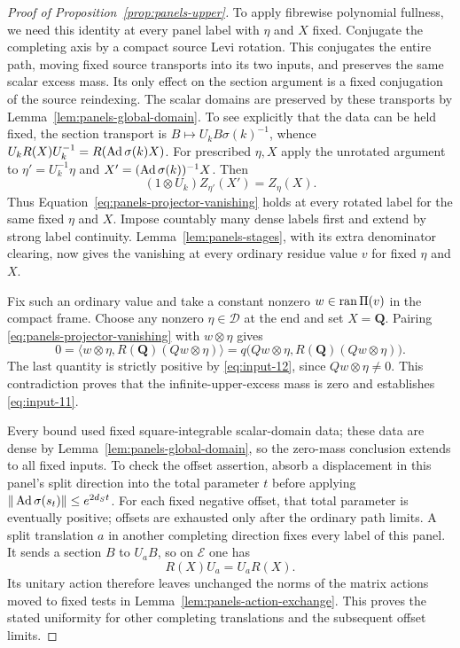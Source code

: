 \begin{proof}[Proof of Proposition~\ref{prop:panels-upper}]
To apply fibrewise polynomial fullness, we need this identity at every
panel label with $\eta$ and $X$ fixed.  Conjugate the completing axis by a
compact source Levi rotation.  This conjugates the entire
path, moving fixed source transports into its two inputs, and preserves
the same scalar excess mass.  Its only effect on the section argument
is a fixed conjugation of the source reindexing.  The scalar domains are
preserved by these transports by
Lemma~\ref{lem:panels-global-domain}.  To see explicitly that the data can be held fixed, the section transport
is $B\mapsto U_k B\sigma(k)^{-1}$, whence
$U_kR(X)U_k^{-1}=R(\operatorname{Ad}\sigma(k)X)$. For prescribed $\eta,X$ apply
the unrotated argument to $\eta'=U_k^{-1}\eta$ and
$X'=(\operatorname{Ad}\sigma(k))^{-1}X$. Then
\[
 (1\otimes U_k)Z_{\eta'}(X')=Z_\eta(X).
\]
Thus Equation~\eqref{eq:panels-projector-vanishing} holds at every
rotated label for the same fixed $\eta$ and $X$.  Impose countably many dense labels first and
extend by strong label continuity.  Lemma~\ref{lem:panels-stages}, with
its extra denominator clearing, now gives the vanishing at every
ordinary residue value $v$ for fixed $\eta$ and $X$.

Fix such an ordinary value and take a constant nonzero
$w\in\operatorname{ran}\Pi(v)$ in the compact frame.  Choose any nonzero
$\eta\in\mathscr D$ at the end and set $X=\mathbf Q$.  Pairing
\eqref{eq:panels-projector-vanishing} with $w\otimes\eta$ gives
\[
 0=\big\langle w\otimes\eta,
          R(\mathbf Q)(Qw\otimes\eta)\big\rangle
   =q\bigl(Qw\otimes\eta,
          R(\mathbf Q)(Qw\otimes\eta)\bigr).
\]
The last quantity is strictly positive by \eqref{eq:input-12}, since
$Qw\otimes\eta\ne0$.  This contradiction proves that the
infinite-upper-excess mass is zero and establishes
\eqref{eq:input-11}.

Every bound used fixed square-integrable scalar-domain data; these data
are dense by Lemma~\ref{lem:panels-global-domain}, so the zero-mass
conclusion extends to all fixed inputs.  To check the offset assertion, absorb a displacement in this panel's
split direction into the total parameter $t$ before applying
$\|\operatorname{Ad}\sigma(s_t)\|\leq e^{2d_St}$.  For each fixed negative offset,
that total parameter is eventually positive; offsets are exhausted only
after the ordinary path limits.  A split translation $a$ in another
completing direction fixes every label of this panel.  It sends a section
$B$ to $U_aB$, so on $\mathcal E$ one has
\[
 R(X)U_a=U_aR(X).
\]
Its unitary action therefore leaves unchanged the norms of the matrix
actions moved to fixed tests in Lemma~\ref{lem:panels-action-exchange}.
This proves the stated uniformity for other completing translations and
the subsequent offset limits.
\end{proof}

